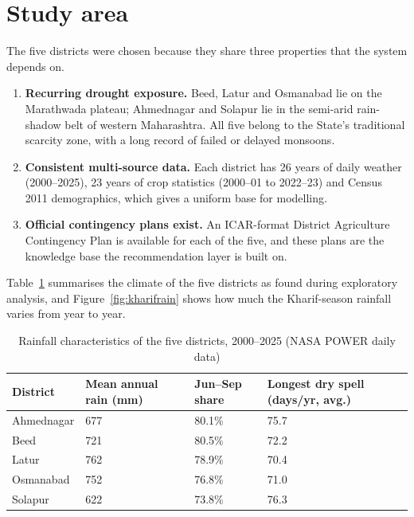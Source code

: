 \label{chap.3}
\section{Study area}
The five districts were chosen because they share three properties that the system depends on.

\begin{enumerate}
	\item \textbf{Recurring drought exposure.} Beed, Latur and Osmanabad lie on the Marathwada plateau; Ahmednagar and Solapur lie in the semi-arid rain-shadow belt of western Maharashtra. All five belong to the State's traditional scarcity zone, with a long record of failed or delayed monsoons.
	\item \textbf{Consistent multi-source data.} Each district has 26 years of daily weather (2000--2025), 23 years of crop statistics (2000--01 to 2022--23) and Census 2011 demographics, which gives a uniform base for modelling.
	\item \textbf{Official contingency plans exist.} An ICAR-format District Agriculture Contingency Plan is available for each of the five, and these plans are the knowledge base the recommendation layer is built on.
\end{enumerate}

Table~\ref{tab:climate} summarises the climate of the five districts as found during exploratory analysis, and Figure~\ref{fig:kharifrain} shows how much the Kharif-season rainfall varies from year to year.

\begin{table}[H]
	\centering
	\caption{Rainfall characteristics of the five districts, 2000--2025 (NASA POWER daily data)}
	\label{tab:climate}
	\small
	\begin{tabular}{lp{3cm}p{2.4cm}p{4cm}}
		\toprule
		\textbf{District} & \textbf{Mean annual rain (mm)} & \textbf{Jun--Sep share} & \textbf{Longest dry spell (days/yr, avg.)} \\
		\midrule
		Ahmednagar & 677 & 80.1\% & 75.7 \\
		Beed       & 721 & 80.5\% & 72.2 \\
		Latur      & 762 & 78.9\% & 70.4 \\
		Osmanabad  & 752 & 76.8\% & 71.0 \\
		Solapur    & 622 & 73.8\% & 76.3 \\
		\bottomrule
	\end{tabular}
\end{table}

